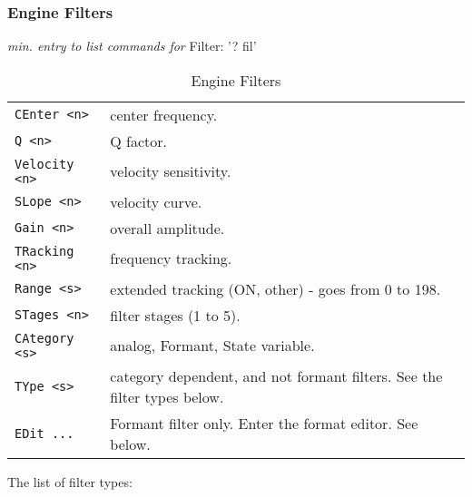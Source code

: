 \subsubsection{Engine Filters}
\label{subsec:command_line_engine_filters}
   \textsl{min. entry to list commands for} Filter: '? fil'
   \begin{table}[H]
      \centering
      \caption{Engine Filters}
      \label{table:yoshimi_engine_filters}
      \begin{tabular}{l l}
\texttt{CEnter <n>} &
   center frequency. \\
\texttt{Q <n>} &
   Q factor.   \\
\texttt{Velocity <n>} &
   velocity sensitivity.   \\
\texttt{SLope <n>} &
   velocity curve.   \\
\texttt{Gain <n>} &
   overall amplitude.   \\
\texttt{TRacking <n>} &
   frequency tracking.  \\
\texttt{Range <s>} &
   extended tracking (ON, {other}) - goes from 0 to 198. \\
\texttt{STages <n>} &
   filter stages (1 to 5). \\
\texttt{CAtegory <s>} &
   analog, Formant, State variable. \\
\texttt{TYpe <s>} &
   category dependent, and not formant filters.
   See the filter types below.   \\
\texttt{EDit ...} &
   Formant filter only. Enter the format editor. See below.   \\
      \end{tabular}
   \end{table}

\pagebreak
   The list of filter types:


